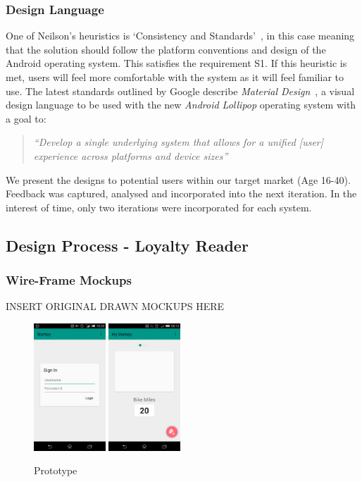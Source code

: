 \subsubsection{Design Language}
One of Neilson's heuristics is `Consistency and Standards'~\cite{jakob}, in this case meaning that the solution should follow the platform conventions and design of the Android operating system. This satisfies the requirement S1. If this heuristic is met, users will feel more comfortable with the system as it will feel familiar to use. The latest standards outlined by Google describe \emph{Material Design}~\cite{materialDesign}, a visual design language to be used with the new \emph{Android Lollipop} operating system with a goal to:
\begin{quote}
    \textit{``Develop a single underlying system that allows for a unified [user] experience across platforms and device sizes''}~\cite[Introduction]{materialDesign}
\end{quote}

We present the designs to potential users within our target market (Age 16-40). Feedback was captured, analysed and incorporated into the next iteration. In the interest of time, only two iterations were incorporated for each system.

\subsection{Design Process - Loyalty Reader}

\subsubsection{Wire-Frame Mockups}
INSERT ORIGINAL DRAWN MOCKUPS HERE
\begin{figure}[H]
 \centering
  \includegraphics[width=0.24\textwidth]{img/loginMockup.png}
   \includegraphics[width=0.24\textwidth]{img/MainMockup.png}
    \caption{Prototype}
\end{figure}

